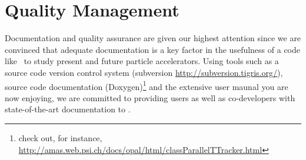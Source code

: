 \section{Quality Management}
Documentation and quality assurance are given our highest attention since we are convinced that adequate documentation 
is a key factor in the usefulness of a code like \opal\ to study present and future particle accelerators. 
 Using tools such as a source code version
control system (subversion  \url{http://subversion.tigris.org/}), source code documentation (Doxygen)\footnote{check out, for instance, \url{http://amas.web.psi.ch/docs/opal/html/classParallelTTracker.html}} and the extensive user maunal
you are now enjoying, we are committed to providing users as well as co-developers with 
state-of-the-art documentation to \opal.

